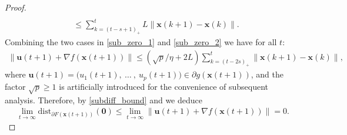 \documentclass[leqno,onefignum,onetabnum]{siamart0516}
\newcommand{\xb}{\mathbf{x}}
\newcommand{\ub}{\mathbf{u}}
\newcommand{\dist}{\mathrm{dist}}
\newcommand{\zero}{\mathbf{0}}
\newcommand{\dind}{k}
\begin{document}
\begin{proof}
\begin{align}
	\nonumber\\
	\label{sub_zero_2}
	&{\le}
	\sum_{\dind = (t-s+1)_+}^{t} L \|\xb(\dind+1) - \xb(\dind)\|.
	\end{align}
	Combining the two cases in \cref{sub_zero_1} and \cref{sub_zero_2} we have for all $t$:
	\begin{align}
	\label{subdiff_bound}
	\| \ub(t+1) + \nabla f(\xb(t+1))\| 
	\leq 
	(\sqrt{p}/\eta + 2L) {\sum_{\dind = (t-2s)_+}^t} \| \xb(\dind+1) - \xb(\dind) \|,
	\end{align}
	where $\ub(t+1) = \big( u_1(t+1),~ \ldots~,~ u_p(t+1) \big) \in \partial g (\xb(t+1))$, and the factor $\sqrt{p} \geq 1$ is artificially introduced for the convenience of subsequent analysis. Therefore, by \cref{subdiff_bound} and  we deduce
	\begin{align}
	\label{crit_1}
	\lim_{t\to\infty} \dist_{\partial F(\xb(t+1))}(\zero) \leq  \lim_{t\to\infty } 	\| \ub(t+1) + \nabla f(\xb(t+1))\| = 0.
	\end{align}
	

\end{proof}
\end{document}
